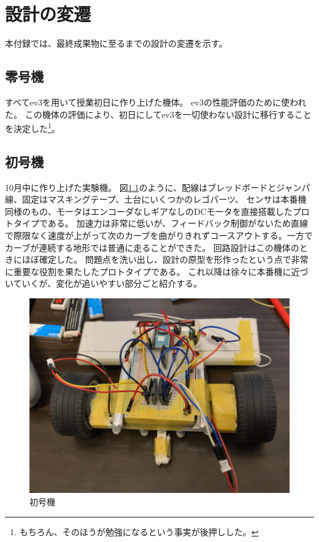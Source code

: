 \documentclass{ltjsreport}
\begin{document}
\chapter{設計の変遷}
本付録では、最終成果物に至るまでの設計の変遷を示す。

\section{零号機}
すべてev3を用いて授業初日に作り上げた機体。
ev3の性能評価のために使われた。
この機体の評価により、初日にしてev3を一切使わない設計に移行することを決定した\footnote{もちろん、そのほうが勉強になるという事実が後押しした。}。

\section{初号機}
10月中に作り上げた実験機。
図\ref{fig:b_machine}のように、配線はブレッドボードとジャンパ線、固定はマスキングテープ、土台にいくつかのレゴパーツ、
センサは本番機同様のもの、モータはエンコーダなしギアなしのDCモータを直接搭載したプロトタイプである。
加速力は非常に低いが、フィードバック制御がないため直線で際限なく速度が上がって次のカーブを曲がりきれずコースアウトする。一方でカーブが連続する地形では普通に走ることができた。
回路設計はこの機体のときにほぼ確定した。
問題点を洗い出し、設計の原型を形作ったという点で非常に重要な役割を果たしたプロトタイプである。
これ以降は徐々に本番機に近づいていくが、変化が追いやすい部分ごと紹介する。
\begin{figure}[bth]
  \centering
  \includegraphics[keepaspectratio, scale=0.2]
       {img/beginning_machine.jpg}
  \caption{初号機}
  \label{fig:b_machine}
 \end{figure}
\end{document}
